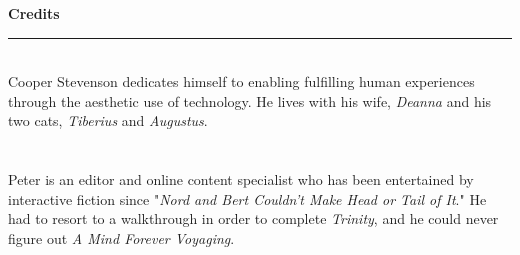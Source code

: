 \documentclass[11.75pt,openany,final]{memoir}
\begin{document}
\BgThispage
\tableofcontents*
\noindent\LARGE{\textbf{Credits}}\medbreak
\hrule
\smallskip
\noindent\large{}\\
\noindent\small{Cooper Stevenson dedicates himself to enabling fulfilling
  human experiences through the aesthetic use of technology. He lives with his
  wife, \emph{Deanna} and his two cats, \emph{Tiberius} and \emph{Augustus}.}\\ \\
\noindent\large{}\\
\noindent \small{Peter is an editor and online content
  specialist who has been entertained by interactive fiction since "\emph{Nord and
    Bert Couldn't Make Head or Tail of It}." He had to resort to a walkthrough in
  order to complete \emph{Trinity}, and he could never figure out \emph{A Mind Forever
    Voyaging}.}
\end{document}
